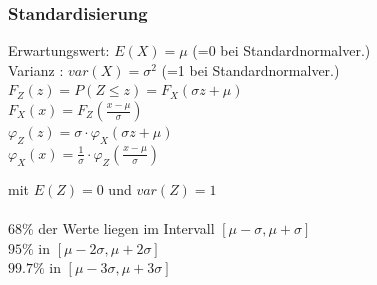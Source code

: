\subsubsection{Standardisierung}
\begin{multicols}{2}
	Erwartungswert: $E(X)=\mu$ \hspace{4mm}(=0 bei Standardnormalver.)\\ 
	Varianz \hspace{11.5mm}: $var(X)=\sigma^2$ (=1 bei Standardnormalver.)\\
	
	$F_Z(z) = P(Z \leq z) = F_X(\sigma z + \mu)$ \\
	$F_X(x) = F_Z(\frac{x-\mu}{\sigma})$\\
	$\varphi_Z(z) = \sigma \cdot \varphi_X(\sigma z + \mu)$\\
	$\varphi_X(x) = \frac{1}{\sigma} \cdot \varphi_Z(\frac{x - \mu}{\sigma})$ 
	\columnbreak

	 \hspace{5mm} mit $E(Z) = 0$ und $var(Z) = 1$\\ \\
	
	$68\% $ der Werte liegen im Intervall $[ \mu - \sigma, \mu + \sigma]$ \\ 
	$95\% $ in $[ \mu - 2\sigma, \mu + 2\sigma]$ \\
	$99.7\% $ in $[ \mu - 3\sigma, \mu + 3\sigma]$

\end{multicols}

\hdashrule{\textwidth}{0.5pt}{3mm}


